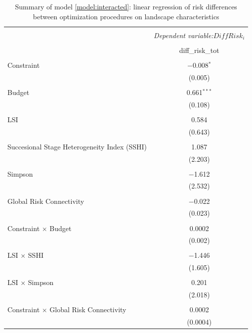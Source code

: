 \begin{table}[!htbp] \centering 
  \caption{Summary of model \ref{model:interacted}: linear regression of risk differences between optimization procedures on landscape characteristics } 
  \label{} 
\begin{tabular}{@{\extracolsep{5pt}}lc} 
\\[-1.8ex]\hline 
\hline \\[-1.8ex] 
 & \multicolumn{1}{c}{\textit{Dependent variable:}$DiffRisk_i$} \\ 
\cline{2-2} 
\\[-1.8ex] & diff\_risk\_tot \\ 
\hline \\[-1.8ex] 
 Constraint & $-$0.008$^{*}$ \\ 
  & (0.005) \\ 
  & \\ 
 Budget & 0.661$^{***}$ \\ 
  & (0.108) \\ 
  & \\ 
 LSI & 0.584 \\ 
  & (0.643) \\ 
  & \\ 
 Succesional Stage Heterogeneity Index (SSHI) & 1.087 \\ 
  & (2.203) \\ 
  & \\ 
 Simpson & $-$1.612 \\ 
  & (2.532) \\ 
  & \\ 
 Global Risk Connectivity & $-$0.022 \\ 
  & (0.023) \\ 
  & \\ 
 Constraint $\times$ Budget & 0.0002 \\ 
  & (0.002) \\ 
  & \\ 
 LSI $\times$ SSHI & $-$1.446 \\ 
  & (1.605) \\ 
  & \\ 
 LSI $\times$ Simpson & 0.201 \\ 
  & (2.018) \\ 
  & \\ 
 Constraint $\times$ Global Risk Connectivity & 0.0002 \\ 
  & (0.0004) \\ 

\end{tabular}
\end{table}
